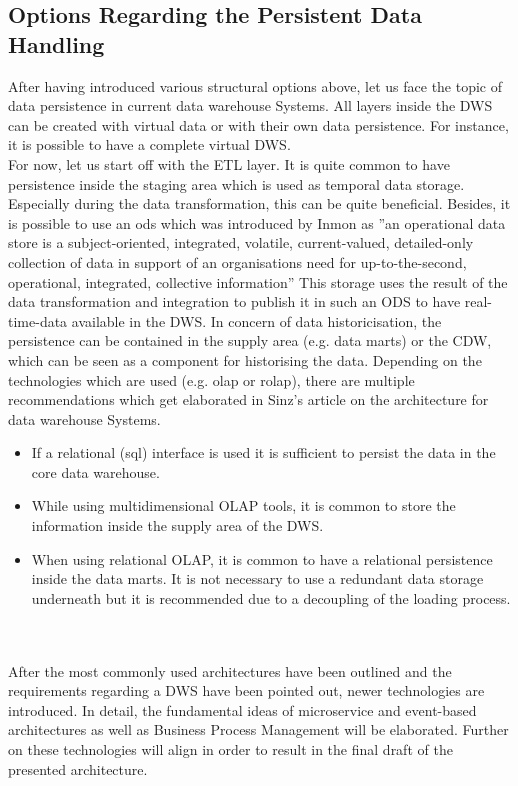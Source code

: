 \subsection{Options Regarding the Persistent Data Handling}
After having introduced various structural options above, let us face the topic of data persistence in current data warehouse Systems.
All layers inside the DWS can be created with virtual data or with their own data persistence. For instance, it is possible to have a complete virtual DWS. \cite{sinz}\newline
\\
For now, let us start off with the ETL layer. It is quite common to have persistence inside the staging area which is used as temporal data storage. Especially during the data transformation, this can be quite beneficial. Besides, it is possible to use an \acrfull{ods} which was introduced by Inmon as ''an operational data store is a subject-oriented, integrated, volatile, current-valued, detailed-only collection of data in support of an organisations need for up-to-the-second, operational, integrated, collective information'' \cite{buildingTheDWS} This storage uses the result of the data transformation and integration to publish it in such an ODS to have real-time-data available in the DWS.\newline
In concern of data historicisation, the persistence can be contained in the supply area (e.g. data marts) or the CDW, which can be seen as a component for historising the data. Depending on the technologies which are used (e.g. \acrshort{olap} or \acrshort{rolap}), there are multiple recommendations which get elaborated in Sinz's article on the architecture for data warehouse Systems.
\begin{itemize}
    \item If a relational (\acrshort{sql}) interface is used it is sufficient to persist the data in the core data warehouse.
    \item While using multidimensional OLAP tools, it is common to store the information inside the supply area of the DWS.
    \item When using relational OLAP, it is common to have a relational persistence inside the data marts. It is not necessary to use a redundant data storage underneath but it is recommended due to a decoupling of the loading process. 
\end{itemize}
\cite{sinz}
\\
\\
After the most commonly used architectures have been outlined and the requirements regarding a DWS have been pointed out, newer technologies are introduced. In detail, the fundamental ideas of microservice and event-based architectures as well as Business Process Management will be elaborated. Further on these technologies will align in order to result in the final draft of the presented architecture.